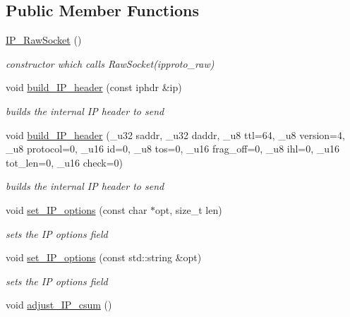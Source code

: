 \subsection*{Public Member Functions}
\begin{CompactItemize}
\item 
\hypertarget{classsocketpp_1_1IP__RawSocket_e523748e7ca5bbcf7b74d804d356630e}{
\hyperlink{classsocketpp_1_1IP__RawSocket_e523748e7ca5bbcf7b74d804d356630e}{IP\_\-RawSocket} ()}
\label{classsocketpp_1_1IP__RawSocket_e523748e7ca5bbcf7b74d804d356630e}

\begin{CompactList}\small\item\em constructor which calls RawSocket(ipproto\_\-raw) \item\end{CompactList}\item 
void \hyperlink{classsocketpp_1_1IP__RawSocket_f93c51a7a8284fe9d2b24019b13a5803}{build\_\-IP\_\-header} (const iphdr \&ip)
\begin{CompactList}\small\item\em builds the internal IP header to send \item\end{CompactList}\item 
\hypertarget{classsocketpp_1_1IP__RawSocket_64e10d0fc07e687ebfeeeff45f29533e}{
void \hyperlink{classsocketpp_1_1IP__RawSocket_64e10d0fc07e687ebfeeeff45f29533e}{build\_\-IP\_\-header} (\_\-u32 saddr, \_\-u32 daddr, \_\-u8 ttl=64, \_\-u8 version=4, \_\-u8 protocol=0, \_\-u16 id=0, \_\-u8 tos=0, \_\-u16 frag\_\-off=0, \_\-u8 ihl=0, \_\-u16 tot\_\-len=0, \_\-u16 check=0)}
\label{classsocketpp_1_1IP__RawSocket_64e10d0fc07e687ebfeeeff45f29533e}

\begin{CompactList}\small\item\em builds the internal IP header to send \item\end{CompactList}\item 
void \hyperlink{classsocketpp_1_1IP__RawSocket_82c0b2c75d081bc84d8e60bf18199e65}{set\_\-IP\_\-options} (const char $\ast$opt, size\_\-t len)
\begin{CompactList}\small\item\em sets the IP options field \item\end{CompactList}\item 
void \hyperlink{classsocketpp_1_1IP__RawSocket_9d88ecec5e362b3cf3d3dbc51d5dd0cd}{set\_\-IP\_\-options} (const std::string \&opt)
\begin{CompactList}\small\item\em sets the IP options field \item\end{CompactList}\item 
\hypertarget{classsocketpp_1_1IP__RawSocket_187bab79c6a8bae17b400a132063a9d1}{
void \hyperlink{classsocketpp_1_1IP__RawSocket_187bab79c6a8bae17b400a132063a9d1}{adjust\_\-IP\_\-csum} ()}
\label{classsocketpp_1_1IP__RawSocket_187bab79c6a8bae17b400a132063a9d1}


\end{CompactItemize}
